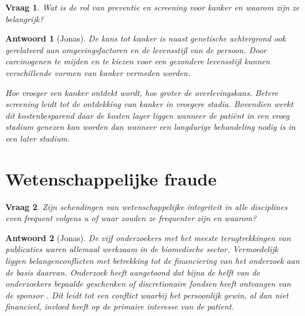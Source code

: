\documentclass{article}
\theoremstyle{nonumberplain}
\newtheorem{question}{Vraag}
\newtheorem{answer}{Antwoord}
\begin{document}
\begin{question}
Wat is de rol van preventie en screening voor kanker en waarom zijn ze
belangrijk?
\end{question}

\begin{answer}[Jonas]

De kans tot kanker is naast genetische achtergrond ook gerelateerd aan
omgevingsfactoren en de levensstijl van de persoon. Door carcinogenen te mijden
en te kiezen voor een gezondere levensstijl kunnen verschillende vormen van
kanker vermeden worden.

Hoe vroeger een kanker ontdekt wordt, hoe groter de overlevingskans. Betere
\emph{screening} leidt tot de ontdekking van kanker in vroegere stadia.
Bovendien werkt dit kostenbesparend daar de kosten lager liggen wanneer de
patiënt in een vroeg stadium genezen kan worden dan wanneer een langdurige
behandeling nodig is in een later stadium.

\end{answer}

\section{Wetenschappelijke fraude}

\begin{question}
Zijn schendingen van wetenschappelijke integriteit in alle disciplines even
frequent volgens u of waar zouden ze frequenter zijn en waarom?
\end{question}

\begin{answer}[Jonas]

De vijf onderzoekers met het meeste terugtrekkingen van publicaties waren
allemaal werkzaam in de biomedische sector. Vermoedelijk liggen
belangenconflicten met betrekking tot de financiering van het onderzoek aan de
basis daarvan. Onderzoek heeft aangetoond dat bijna de helft van de onderzoekers
bepaalde geschenken of discretionaire fondsen heeft ontvangen van de sponsor
\cite{doi:10.1001/jama.289.4.454}. Dit leidt tot een conflict waarbij het
persoonlijk gewin, al dan niet financieel, invloed heeft op de primaire
interesse van de patient.

\end{answer}

\nocite{*}
\printbibliography
\end{document}
